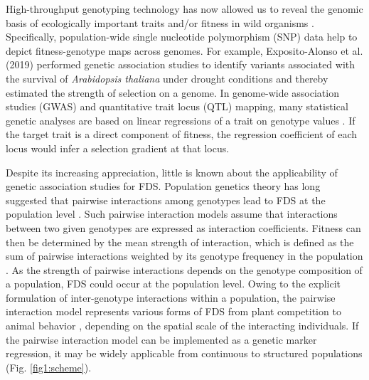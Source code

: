 \documentclass[12pt,]{article}
\begin{document}
High-throughput genotyping technology has now allowed us to reveal the genomic basis of ecologically important traits and/or fitness in wild organisms \citep{durham_genome-wide_2014, fisher_genetic_2016, nosil2018natural, exposito2019natural, tsuchimatsu2020adaptive}. Specifically, population-wide single nucleotide polymorphism (SNP) data help to depict fitness-genotype maps across genomes. For example, Exposito-Alonso et al. (2019) performed genetic association studies to identify variants associated with the survival of \textit{Arabidopsis thaliana} under drought conditions and thereby estimated the strength of selection on a genome. In genome-wide association studies (GWAS) and quantitative trait locus (QTL) mapping, many statistical genetic analyses are based on linear regressions of a trait on genotype values \citep{broman2009single, gondro2013genome}. If the target trait is a direct component of fitness, the regression coefficient of each locus would infer a selection gradient \citep{lande1983measurement} at that locus.

Despite its increasing appreciation, little is known about the applicability of genetic association studies for FDS. Population genetics theory has long suggested that pairwise interactions among genotypes lead to FDS at the population level \citep{schutz1969inter, cockerham1972frequency, asmussen_frequency-dependent_1990, schneider_maximization_2008}. Such pairwise interaction models assume that interactions between two given genotypes are expressed as interaction coefficients. Fitness can then be determined by the mean strength of interaction, which is defined as the sum of pairwise interactions weighted by its genotype frequency in the population \citep{cockerham1972frequency, asmussen_frequency-dependent_1990}. As the strength of pairwise interactions depends on the genotype composition of a population, FDS could occur at the population level. Owing to the explicit formulation of inter-genotype interactions within a population, the pairwise interaction model represents various forms of FDS from plant competition \citep{schutz1969inter} to animal behavior \citep{alvarez2005models}, depending on the spatial scale of the interacting individuals. If the pairwise interaction model can be implemented as a genetic marker regression, it may be widely applicable from continuous to structured populations (Fig. \ref{fig1:scheme}).
\end{document}
